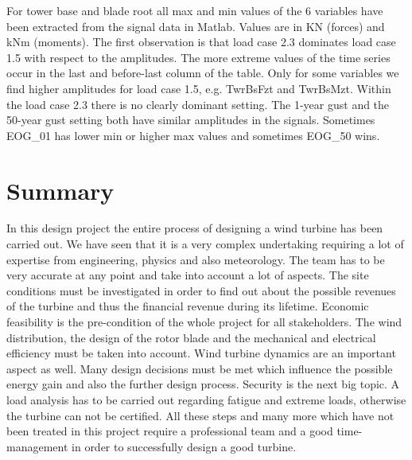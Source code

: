 \documentclass[10pt]{article}
\begin{document}
For tower base and blade root all max and min values of the 6 variables have been extracted from the signal data in Matlab. Values are in KN (forces) and kNm (moments). The first observation is that load case 2.3 dominates load case 1.5 with respect to the amplitudes. The more extreme values of the time series occur in the last and before-last column of the table. Only for some variables we find higher amplitudes for load case 1.5, e.g. TwrBsFzt and TwrBsMzt. 
Within the load case 2.3 there is no clearly dominant setting. The 1-year gust and the 50-year gust setting both have similar amplitudes in the signals. Sometimes EOG\_01 has lower min or higher max values and sometimes EOG\_50 wins.

\section{Summary}
In this design project the entire process of designing a wind turbine has been carried out. We have seen that it is a very complex undertaking requiring a lot of expertise from engineering, physics and also meteorology. The team has to be very accurate at any point and take into account a lot of aspects. The site conditions must be investigated in order to find out about the possible revenues of the turbine and thus the financial revenue during its lifetime. Economic feasibility is the pre-condition of the whole project for all stakeholders.
The wind distribution, the design of the rotor blade and the mechanical
and electrical efficiency must be taken into account. Wind turbine dynamics are an important aspect as well. Many design decisions must be met which influence the possible energy gain and also the further design process. Security is the next big topic. A load analysis has to be carried out regarding fatigue and extreme loads, otherwise the turbine can not be certified.
All these steps and many more which have not been treated in this project require a professional team and a good time-management in order to successfully design a good turbine.
\end{document}
